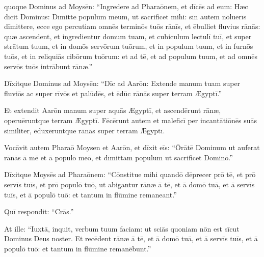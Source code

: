 

\thispagestyle{empty}

 quoque Dominus ad Moysēn: ``Ingredere 
ad Pharaōnem, et dīcēs ad eum: Hæc dīcit
Dominus: Dīmitte populum meum, ut sacrificet mihi: sīn autem nōluerīs
dīmittere, ecce ego percutiam omnēs terminōs tuōs
rānīs,  et ēbulliet fluvius
rānās: quæ ascendent, et ingredientur domum tuam, et cubiculum lectulī tuī, et super strātum
tuum, et in domōs servōrum tuōrum, et in populum tuum, et in
furnōs tuōs, et in reliquiās cibōrum tuōrum:
et ad tē, et ad populum tuum, et ad omnēs servōs tuōs intrābunt
rānæ.''

Dīxitque Dominus ad Moysēn: ``Dīc ad
Aarōn: Extende manum tuam super fluviōs ac super rīvōs et
palūdēs, et ēdūc rānās super terram Ægyptī.''

Et extendit Aarōn manum super aquās Ægyptī, et ascendērunt
rānæ, operuēruntque terram Ægyptī.  Fēcērunt autem et
maleficī per incantātiōnēs suās similiter, ēdūxēruntque rānās super terram Ægyptī.

Vocāvit autem Pharaō Moysen et Aarōn, et
dīxit eīs: ``Ōrātē Dominum ut auferat rānās ā mē et ā populō
meō, et dīmittam populum ut sacrificet Dominō.''

Dīxitque Moysēs
ad Pharaōnem: ``Cōnstitue mihi quandō
dēprecer prō tē, et prō servīs tuīs, et prō populō tuō, ut
abigantur rānæ ā tē, et ā domō tuā, et ā
servīs tuīs, et ā populō tuō: et tantum in flūmine remaneant.''

Quī respondit: ``Crās.''

At ille: ``Iuxtā, inquit, verbum tuum faciam: ut sciās
quoniam nōn est sīcut Dominus Deus noster.  Et recēdent
rānæ ā tē, et ā domō tuā, et ā servīs tuīs, et ā populō tuō:
et tantum in flūmine remanēbunt.''

